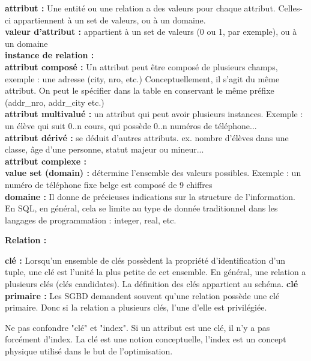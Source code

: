 \textbf{attribut :} Une entité ou une relation a des valeurs pour chaque attribut.
Celles-ci appartiennent à un set de valeurs, ou à un domaine.\\

\textbf{valeur d'attribut :} appartient à un set de valeurs (0 ou 1, par exemple), ou à un domaine\\

\textbf{instance de relation :} \\

\textbf{attribut composé :} Un attribut peut être composé de plusieurs champs, exemple : une adresse (city, nro, etc.) Conceptuellement, il s'agit du même attribut. On peut le spécifier dans la table en conservant le même préfixe (addr\_nro, addr\_city etc.)
\\

\textbf{attribut multivalué :} un attribut qui peut avoir plusieurs instances. 
Exemple : un élève qui suit 0..n cours, qui possède 0..n numéros de téléphone...\\

\textbf{attribut dérivé :} se déduit d'autres attributs. ex. nombre d'élèves dans une classe, âge d'une personne, statut majeur ou mineur...\\
\textbf{attribut complexe :} \\
\textbf{value set (domain) :} détermine l'ensemble des valeurs possibles. 
Exemple : un numéro de téléphone fixe belge est composé de 9 chiffres\\

\textbf{domaine :} Il donne de précieuses indications sur la structure de l'information. En SQL, en général, cela se limite au type de donnée traditionnel 
dans les langages de programmation : integer, real, etc. 

\textbf{Relation :}

\textbf{clé :} Lorsqu'un ensemble de clés possèdent la propriété d'identification d'un tuple, une clé est l'unité la plus petite de cet ensemble.
En général, une relation a plusieurs clés (clés candidates). 
La définition des clés appartient au schéma.
\textbf{clé primaire :} Les SGBD demandent souvent qu'une relation possède une clé primaire. Donc si la relation a plusieurs clés, l'une d'elle est 
privilégiée. 

Ne pas confondre "clé" et "index". Si un attribut est une clé, il n'y a pas forcément d'index. 
La clé est une notion conceptuelle, l'index est un concept physique utilisé dans le 
but de l'optimisation.


